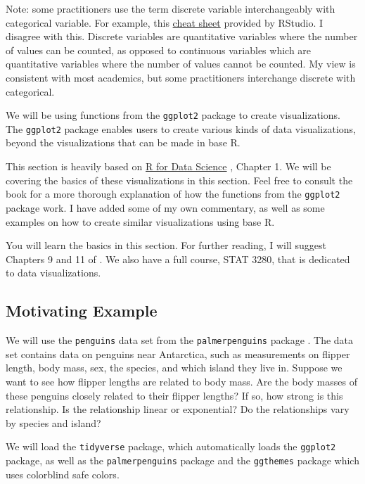 \documentclass[
]{book}
\theoremstyle{definition}
\theoremstyle{definition}
\theoremstyle{definition}
\theoremstyle{definition}
\theoremstyle{remark}
\begin{document}
Note: some practitioners use the term discrete variable interchangeably with categorical variable. For example, this \href{https://rstudio.github.io/cheatsheets/html/data-visualization.html}{cheat sheet} provided by RStudio. I disagree with this. Discrete variables are quantitative variables where the number of values can be counted, as opposed to continuous variables which are quantitative variables where the number of values cannot be counted. My view is consistent with most academics, but some practitioners interchange discrete with categorical.

We will be using functions from the \texttt{ggplot2} package to create visualizations. The \texttt{ggplot2} package enables users to create various kinds of data visualizations, beyond the visualizations that can be made in base R.

This section is heavily based on \href{https://r4ds.hadley.nz/}{R for Data Science} \citep{wickham2023}, Chapter 1. We will be covering the basics of these visualizations in this section. Feel free to consult the book for a more thorough explanation of how the functions from the \texttt{ggplot2} package work. I have added some of my own commentary, as well as some examples on how to create similar visualizations using base R.

You will learn the basics in this section. For further reading, I will suggest Chapters 9 and 11 of \citet{wickham2023}. We also have a full course, STAT 3280, that is dedicated to data visualizations.

\hypertarget{motivating-example}{%
\subsection{Motivating Example}\label{motivating-example}}

We will use the \texttt{penguins} data set from the \texttt{palmerpenguins} package \citep{penguins}. The data set contains data on penguins near Antarctica, such as measurements on flipper length, body mass, sex, the species, and which island they live in. Suppose we want to see how flipper lengths are related to body mass. Are the body masses of these penguins closely related to their flipper lengths? If so, how strong is this relationship. Is the relationship linear or exponential? Do the relationships vary by species and island?

We will load the \texttt{tidyverse} package, which automatically loads the \texttt{ggplot2} package, as well as the \texttt{palmerpenguins} package and the \texttt{ggthemes} package which uses colorblind safe colors.
\end{document}
